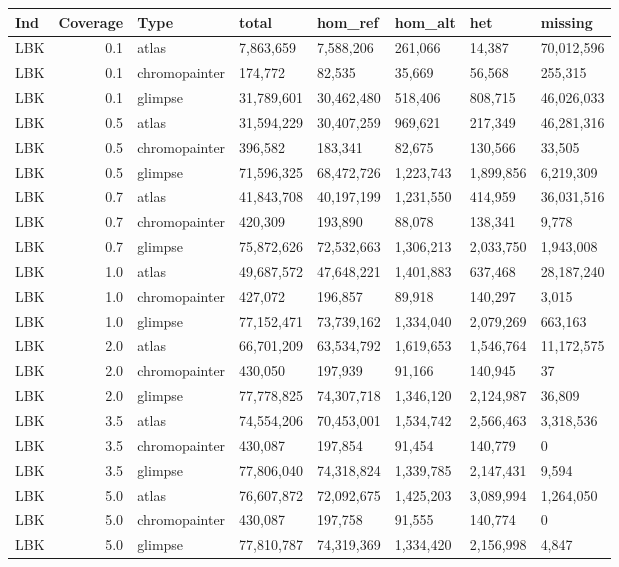 {\begin{longtable}[t]{lrllllll}
\toprule
Ind & Coverage & Type & total & hom\_ref & hom\_alt & het & missing\\
\midrule
LBK & 0.1 & atlas & 7,863,659 & 7,588,206 & 261,066 & 14,387 & 70,012,596\\
LBK & 0.1 & chromopainter & 174,772 & 82,535 & 35,669 & 56,568 & 255,315\\
LBK & 0.1 & glimpse & 31,789,601 & 30,462,480 & 518,406 & 808,715 & 46,026,033\\
LBK & 0.5 & atlas & 31,594,229 & 30,407,259 & 969,621 & 217,349 & 46,281,316\\
LBK & 0.5 & chromopainter & 396,582 & 183,341 & 82,675 & 130,566 & 33,505\\
LBK & 0.5 & glimpse & 71,596,325 & 68,472,726 & 1,223,743 & 1,899,856 & 6,219,309\\
LBK & 0.7 & atlas & 41,843,708 & 40,197,199 & 1,231,550 & 414,959 & 36,031,516\\
LBK & 0.7 & chromopainter & 420,309 & 193,890 & 88,078 & 138,341 & 9,778\\
LBK & 0.7 & glimpse & 75,872,626 & 72,532,663 & 1,306,213 & 2,033,750 & 1,943,008\\
LBK & 1.0 & atlas & 49,687,572 & 47,648,221 & 1,401,883 & 637,468 & 28,187,240\\
LBK & 1.0 & chromopainter & 427,072 & 196,857 & 89,918 & 140,297 & 3,015\\
LBK & 1.0 & glimpse & 77,152,471 & 73,739,162 & 1,334,040 & 2,079,269 & 663,163\\
LBK & 2.0 & atlas & 66,701,209 & 63,534,792 & 1,619,653 & 1,546,764 & 11,172,575\\
LBK & 2.0 & chromopainter & 430,050 & 197,939 & 91,166 & 140,945 & 37\\
LBK & 2.0 & glimpse & 77,778,825 & 74,307,718 & 1,346,120 & 2,124,987 & 36,809\\
LBK & 3.5 & atlas & 74,554,206 & 70,453,001 & 1,534,742 & 2,566,463 & 3,318,536\\
LBK & 3.5 & chromopainter & 430,087 & 197,854 & 91,454 & 140,779 & 0\\
LBK & 3.5 & glimpse & 77,806,040 & 74,318,824 & 1,339,785 & 2,147,431 & 9,594\\
LBK & 5.0 & atlas & 76,607,872 & 72,092,675 & 1,425,203 & 3,089,994 & 1,264,050\\
LBK & 5.0 & chromopainter & 430,087 & 197,758 & 91,555 & 140,774 & 0\\
LBK & 5.0 & glimpse & 77,810,787 & 74,319,369 & 1,334,420 & 2,156,998 & 4,847\\

\end{longtable}}
